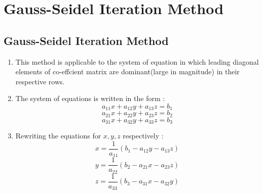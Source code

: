 \newpage
\chapter{Gauss-Seidel Iteration Method}

\section{Gauss-Seidel Iteration Method}

\begin{enumerate}

    \item This method is applicable to the system of equation in which leading diagonal elements of co-effcient matrix are dominant(large in magnitude) in their respective rows.
  
    \item The system of equations is written in the form :
    \begin{equation*}
      a_{11}x + a_{12}y + a_{13}z = b_1
    \end{equation*}
    \begin{equation*}
      a_{21}x + a_{22}y + a_{23}z = b_2
    \end{equation*}
    \begin{equation*}
      a_{31}x + a_{32}y + a_{33}z = b_3
    \end{equation*}
  
  
    \item Rewriting the equations for $x, y, z$ respectively :
    \begin{equation*}
      x = \frac{1}{a_{11}}(b_1 - a_{12}y - a_{13}z)
    \end{equation*}
    \begin{equation*}
      y = \frac{1}{a_{22}}(b_2 - a_{21}x - a_{23}z)
    \end{equation*}
    \begin{equation*}
      z = \frac{1}{a_{33}}(b_3 - a_{31}x - a_{32}y)
    \end{equation*}
  

\end{enumerate}
